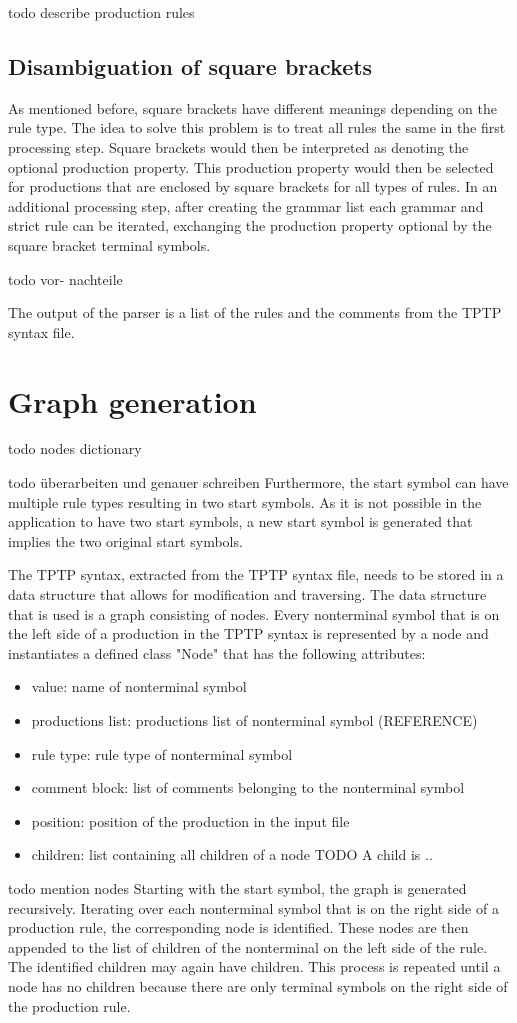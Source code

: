 todo describe production rules

\subsection{Disambiguation of  square brackets}
As mentioned before, square brackets have different meanings depending on the rule type.
The idea to solve this problem is to treat all rules the same in the first processing step.
Square brackets would then be interpreted as denoting the optional production property.
This production property would then be selected for productions that are enclosed by square brackets for all types of rules.
In an additional processing step, after creating the grammar list each grammar and strict rule can be iterated, exchanging the production property optional by the square bracket terminal symbols.

todo vor- nachteile


The output of the parser is a list of the rules and the comments from the \ac{TPTP} syntax file.
\section{Graph generation}\label{sec:ConceptGraphGeneration}
todo nodes dictionary

todo überarbeiten und genauer schreiben
Furthermore, the start symbol can have multiple rule types resulting in two start symbols. As it is not possible in the application to have two start symbols, a new start symbol is generated that implies the two original start symbols. 

The \ac{TPTP} syntax, extracted from the \ac{TPTP} syntax file, needs to be stored in a data structure that allows for modification and traversing.
The data structure that is used is a graph consisting of nodes. 
Every nonterminal symbol that is on the left side of a production in the \ac{TPTP} syntax is represented by a node and instantiates a defined class "Node" that has the following attributes:
\begin{itemize}
\item value: name of nonterminal symbol
\item productions list: productions list of nonterminal symbol (REFERENCE)
\item rule type:  rule type of nonterminal symbol
\item comment block: list of comments belonging to the nonterminal symbol
\item position: position of the production in the input file
\item children: list containing all children of a node
TODO A child is ..
\end{itemize} 
todo mention nodes
Starting with the start symbol, the graph is generated recursively. Iterating over each nonterminal symbol that is on the right side of a production rule, the corresponding node is identified. These nodes are then appended to the list of children of the nonterminal on the left side of the rule. The identified children may again have children. This process is repeated until a node has no children because there are only terminal symbols on the right side of the production rule.

